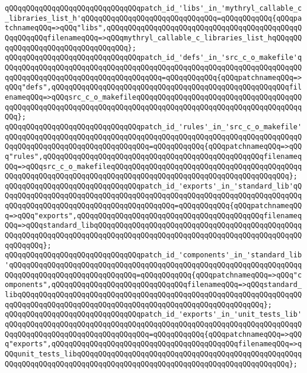 \newline
\verb|qQQqqQQqqQQqqQQqqQQqqQQqqQQqqQQqpatch_id_'libs'_in_'mythryl_callable_c_libraries_list_h'qQQqqQQqqQQqqQQqqQQqqQQqqQQqqQQq=qQQqqQQqqQQq{qQQqpatchnameqQQq=>qQQq"libs",qQQqqQQqqQQqqQQqqQQqqQQqqQQqqQQqqQQqqQQqqQQqqQQqqQQqqQQqfilenameqQQq=>qQQqmythryl_callable_c_libraries_list_hqQQqqQQqqQQqqQQqqQQqqQQqqQQqqQQqqQQq};|\newline
\newline
\verb|qQQqqQQqqQQqqQQqqQQqqQQqqQQqqQQqpatch_id_'defs'_in_'src_c_o_makefile'qQQqqQQqqQQqqQQqqQQqqQQqqQQqqQQqqQQqqQQqqQQqqQQqqQQqqQQqqQQqqQQqqQQqqQQqqQQqqQQqqQQqqQQqqQQqqQQqqQQqqQQqqQQq=qQQqqQQqqQQq{qQQqpatchnameqQQq=>qQQq"defs",qQQqqQQqqQQqqQQqqQQqqQQqqQQqqQQqqQQqqQQqqQQqqQQqqQQqqQQqfilenameqQQq=>qQQqsrc_c_o_makefileqQQqqQQqqQQqqQQqqQQqqQQqqQQqqQQqqQQqqQQqqQQqqQQqqQQqqQQqqQQqqQQqqQQqqQQqqQQqqQQqqQQqqQQqqQQqqQQqqQQqqQQqqQQqqQQq};|\newline
\verb|qQQqqQQqqQQqqQQqqQQqqQQqqQQqqQQqpatch_id_'rules'_in_'src_c_o_makefile'qQQqqQQqqQQqqQQqqQQqqQQqqQQqqQQqqQQqqQQqqQQqqQQqqQQqqQQqqQQqqQQqqQQqqQQqqQQqqQQqqQQqqQQqqQQqqQQqqQQqqQQq=qQQqqQQqqQQq{qQQqpatchnameqQQq=>qQQq"rules",qQQqqQQqqQQqqQQqqQQqqQQqqQQqqQQqqQQqqQQqqQQqqQQqqQQqfilenameqQQq=>qQQqsrc_c_o_makefileqQQqqQQqqQQqqQQqqQQqqQQqqQQqqQQqqQQqqQQqqQQqqQQqqQQqqQQqqQQqqQQqqQQqqQQqqQQqqQQqqQQqqQQqqQQqqQQqqQQqqQQqqQQqqQQq};|\newline
\newline
\verb|qQQqqQQqqQQqqQQqqQQqqQQqqQQqqQQqpatch_id_'exports'_in_'standard_lib'qQQqqQQqqQQqqQQqqQQqqQQqqQQqqQQqqQQqqQQqqQQqqQQqqQQqqQQqqQQqqQQqqQQqqQQqqQQqqQQqqQQqqQQqqQQqqQQqqQQqqQQqqQQqqQQq=qQQqqQQqqQQq{qQQqpatchnameqQQq=>qQQq"exports",qQQqqQQqqQQqqQQqqQQqqQQqqQQqqQQqqQQqqQQqqQQqfilenameqQQq=>qQQqstandard_libqQQqqQQqqQQqqQQqqQQqqQQqqQQqqQQqqQQqqQQqqQQqqQQqqQQqqQQqqQQqqQQqqQQqqQQqqQQqqQQqqQQqqQQqqQQqqQQqqQQqqQQqqQQqqQQqqQQqqQQqqQQqqQQq};|\newline
\verb|qQQqqQQqqQQqqQQqqQQqqQQqqQQqqQQqpatch_id_'components'_in_'standard_lib'qQQqqQQqqQQqqQQqqQQqqQQqqQQqqQQqqQQqqQQqqQQqqQQqqQQqqQQqqQQqqQQqqQQqqQQqqQQqqQQqqQQqqQQqqQQqqQQqqQQq=qQQqqQQqqQQq{qQQqpatchnameqQQq=>qQQq"components",qQQqqQQqqQQqqQQqqQQqqQQqqQQqqQQqfilenameqQQq=>qQQqstandard_libqQQqqQQqqQQqqQQqqQQqqQQqqQQqqQQqqQQqqQQqqQQqqQQqqQQqqQQqqQQqqQQqqQQqqQQqqQQqqQQqqQQqqQQqqQQqqQQqqQQqqQQqqQQqqQQqqQQqqQQqqQQqqQQq};|\newline
\newline
\verb|qQQqqQQqqQQqqQQqqQQqqQQqqQQqqQQqpatch_id_'exports'_in_'unit_tests_lib'qQQqqQQqqQQqqQQqqQQqqQQqqQQqqQQqqQQqqQQqqQQqqQQqqQQqqQQqqQQqqQQqqQQqqQQqqQQqqQQqqQQqqQQqqQQqqQQqqQQqqQQq=qQQqqQQqqQQq{qQQqpatchnameqQQq=>qQQq"exports",qQQqqQQqqQQqqQQqqQQqqQQqqQQqqQQqqQQqqQQqqQQqfilenameqQQq=>qQQqunit_tests_libqQQqqQQqqQQqqQQqqQQqqQQqqQQqqQQqqQQqqQQqqQQqqQQqqQQqqQQqqQQqqQQqqQQqqQQqqQQqqQQqqQQqqQQqqQQqqQQqqQQqqQQqqQQqqQQqqQQqqQQq};|\newline
